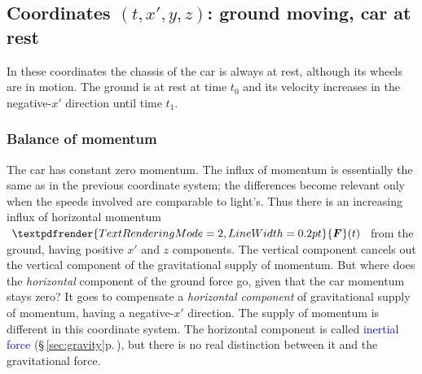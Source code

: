 \documentclass[a4paper,12pt,%
onecolumn,oneside,%
british%
]{memoir}
\providecommand{\href}[2]{#2}
\renewcommand*{\bm}[1]{\textpdfrender{TextRenderingMode=2,LineWidth=0.2pt}{\boldsymbol{#1}}}
\renewcommand*{\|}[1][]{\nonscript\:#1\vert\nonscript\:\mathopen{}}
\newcommand*{\sect}{\S}%
\newcommand*{\furl}[2]{\href{#1}{#2}\pagenote{\url{#1}}}
\renewcommand*{\autoref}[3][\sect\,\ref]{\textcolor{blue}{#3} {\color{blue}\scriptsize(\faIcon[regular]{eye}\;#1{#2}\;p.\,\pageref{#2})}}
\newcommand*{\yti}{t_{0}}
\newcommand*{\ytf}{t_{1}}
\newcommand*{\yF}{\bm{F}}
\begin{document}
\medskip


\subsection{Coordinates $(t,x',y,z)$: ground moving, car at rest}
\label{sec:car_road_1}

%
%
In these coordinates the chassis of the car is always at rest, although its wheels are in motion. The ground is at rest at time $\yti$ and its velocity increases in the negative-$x'$ direction until time $\ytf$.

\subsubsection{Balance of momentum}

The car has constant zero momentum. The influx of momentum is essentially the same as in the previous coordinate system; the differences become relevant only when the speeds involved are comparable to light's. Thus there is an increasing influx of horizontal momentum $\yF(t)$ from the ground, having positive $x'$ and $z$ components. The vertical component cancels out the vertical component of the gravitational supply of momentum. But where does the \emph{horizontal} component of the ground force go, given that the car momentum stays zero? It goes to compensate a \emph{horizontal component} of gravitational supply of momentum, having a negative-$x'$ direction. The supply of momentum is different in this coordinate system. The horizontal component is called \autoref{sec:gravity}{inertial force}, but there is no real distinction between it and the gravitational force.
\end{document}
